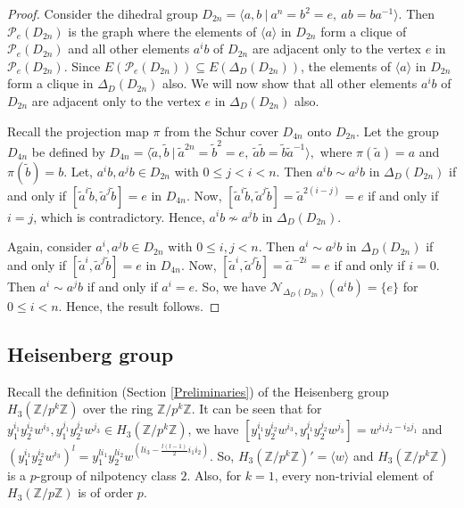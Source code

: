 \documentclass[12pt,a4paper]{article}
\begin{document}
\begin{proof}
Consider the dihedral group $D_{2n}= \langle a, b ~\lvert~ a^{n} = b^2 = e, ~ ab = ba^{-1} \rangle$. Then $\mathcal{P}_e(D_{2n})$ is the graph where the elements of $\langle a\rangle$ in $D_{2n}$ form a clique of $\mathcal{P}_e(D_{2n})$ and all other elements $a^ib$ of $D_{2n}$ are adjacent only to the vertex $e$ in $\mathcal{P}_e(D_{2n})$. Since $E(\mathcal{P}_e(D_{2n}))\subseteq E(\Delta_D(D_{2n}))$, the elements of $\langle a\rangle$ in $D_{2n}$ form a clique in $\Delta_D(D_{2n})$ also. We will now show that all other elements $a^ib$ of $D_{2n}$ are adjacent only to the vertex $e$ in $\Delta_D(D_{2n})$ also.

Recall the projection map $\pi$ from the Schur cover $D_{4n}$ onto $D_{2n}$. Let the group $D_{4n}$ be defined by $D_{4n} = \langle \tilde{a}, \tilde{b} ~\lvert~ \tilde{a}^{2n} = \tilde{b}^2 = e, ~ \tilde{a}\tilde{b} = \tilde{b}\tilde{a}^{-1} \rangle,$ where $\pi(\tilde{a})=a$ and $\pi(\tilde{b})=b$. Let, $a^ib, a^jb\in D_{2n}$ with $0\leq j<i<n$. Then $a^ib\sim a^jb$ in $\Delta_D(D_{2n})$ if and only if $[\tilde{a}^i\tilde{b}, \tilde{a}^j\tilde{b}]=e$ in $D_{4n}$. Now, $[\tilde{a}^i\tilde{b}, \tilde{a}^j\tilde{b}]=\tilde{a}^{2(i-j)}=e$ if and only if $i=j$, which is contradictory. Hence, $a^ib\nsim a^jb$ in $\Delta_D(D_{2n})$.

Again, consider $a^i, a^jb\in D_{2n}$ with $0\leq i,j<n$. Then $a^i\sim a^jb$ in $\Delta_D(D_{2n})$ if and only if $[\tilde{a}^i, \tilde{a}^j\tilde{b}]=e$ in $D_{4n}$. Now, $[\tilde{a}^i, \tilde{a}^j\tilde{b}]=\tilde{a}^{-2i}=e$ if and only if $i=0$. Then $a^i\sim a^jb$ if and only if $a^i=e$. So, we have $\mathcal{N}_{\Delta_D(D_{2n})}(a^ib)=\{e\}$ for $0\leq i<n$. Hence, the result follows.
\end{proof} 


\subsection{Heisenberg group}\label{Heisenberg group}

Recall the definition (Section \ref{Preliminaries}) of the Heisenberg group $H_3(\mathbb{Z}/p^k\mathbb{Z})$ over the ring $\mathbb{Z}/p^k\mathbb{Z}$. It can be seen that for $y_1^{i_1}y_2^{i_2}w^{i_3},y_1^{j_1}y_2^{j_2}w^{j_3}\in H_3(\mathbb{Z}/p^k\mathbb{Z})$, we have $[y_1^{i_1}y_2^{i_2}w^{i_3},y_1^{j_1}y_2^{j_2}w^{j_3}]=w^{i_1j_2-i_2j_1}$ and $(y_1^{i_1}y_2^{i_2}w^{i_3})^l=y_1^{li_1}y_2^{li_2}w^{(li_3-\frac{l(l-1)}{2}i_1i_2)}$. So, $H_3(\mathbb{Z}/p^k\mathbb{Z})'=\langle w\rangle$ and $H_3(\mathbb{Z}/p^k\mathbb{Z})$ is a $p$-group of nilpotency class $2$. Also, for $k=1$, every non-trivial element of $H_3(\mathbb{Z}/p\mathbb{Z})$ is of order $p$.
\end{document}
